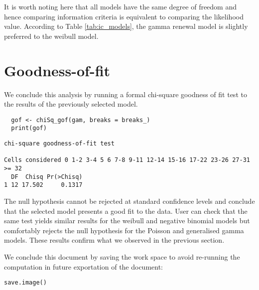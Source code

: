\documentclass[a4paper,twoside,11pt]{article}
\begin{document}
It is worth noting here that all models have the same degree of freedom and
hence comparing information criteria is equivalent to comparing the likelihood
value. According to Table \ref{tab:ic_models}, the gamma renewal model is slightly
preferred to the weibull model.   

\section{Goodness-of-fit}
\label{sec:org2626954}
We conclude this analysis by running a formal chi-square goodness of fit test 
\citep[Section 5.3.4]{cameron2013regression} to the results of the previously
selected model.
\begin{verbatim}
  gof <- chiSq_gof(gam, breaks = breaks_)
  print(gof)
\end{verbatim}

\begin{verbatim}
chi-square goodness-of-fit test

Cells considered 0 1-2 3-4 5 6 7-8 9-11 12-14 15-16 17-22 23-26 27-31 >= 32
  DF  Chisq Pr(>Chisq)
1 12 17.502     0.1317
\end{verbatim}

The null hypothesis cannot be rejected at standard confidence levels and
conclude that the selected model presents a good fit to the data. User can check
that the same test yields similar results for the weibull and negative binomial
models but comfortably rejects the null hypothesis for the Poisson and
generalised gamma models. These results confirm what we observed in the previous
section.

\label{sec:orga3dd32d}
We conclude this document by saving the work space to avoid re-running the
computation in future exportation of the document:
\begin{verbatim}
save.image()
\end{verbatim}




\label{sec:orgdf2f41b}


\end{document}
